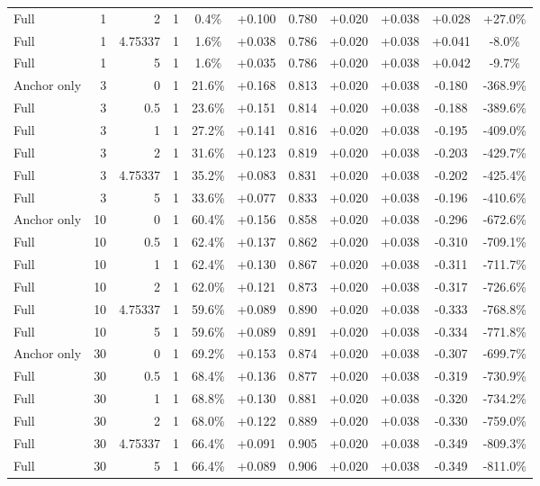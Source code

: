 \begin{table}[htbp]
\begin{tabular}{lrrrccccccc}
Full & 1 & 2 & 1 & 0.4\% & +0.100 & 0.780 & +0.020 & +0.038 & +0.028 & +27.0\% \\
Full & 1 & 4.75337 & 1 & 1.6\% & +0.038 & 0.786 & +0.020 & +0.038 & +0.041 & -8.0\% \\
Full & 1 & 5 & 1 & 1.6\% & +0.035 & 0.786 & +0.020 & +0.038 & +0.042 & -9.7\% \\
Anchor only & 3 & 0 & 1 & 21.6\% & +0.168 & 0.813 & +0.020 & +0.038 & -0.180 & -368.9\% \\
Full & 3 & 0.5 & 1 & 23.6\% & +0.151 & 0.814 & +0.020 & +0.038 & -0.188 & -389.6\% \\
Full & 3 & 1 & 1 & 27.2\% & +0.141 & 0.816 & +0.020 & +0.038 & -0.195 & -409.0\% \\
Full & 3 & 2 & 1 & 31.6\% & +0.123 & 0.819 & +0.020 & +0.038 & -0.203 & -429.7\% \\
Full & 3 & 4.75337 & 1 & 35.2\% & +0.083 & 0.831 & +0.020 & +0.038 & -0.202 & -425.4\% \\
Full & 3 & 5 & 1 & 33.6\% & +0.077 & 0.833 & +0.020 & +0.038 & -0.196 & -410.6\% \\
Anchor only & 10 & 0 & 1 & 60.4\% & +0.156 & 0.858 & +0.020 & +0.038 & -0.296 & -672.6\% \\
Full & 10 & 0.5 & 1 & 62.4\% & +0.137 & 0.862 & +0.020 & +0.038 & -0.310 & -709.1\% \\
Full & 10 & 1 & 1 & 62.4\% & +0.130 & 0.867 & +0.020 & +0.038 & -0.311 & -711.7\% \\
Full & 10 & 2 & 1 & 62.0\% & +0.121 & 0.873 & +0.020 & +0.038 & -0.317 & -726.6\% \\
Full & 10 & 4.75337 & 1 & 59.6\% & +0.089 & 0.890 & +0.020 & +0.038 & -0.333 & -768.8\% \\
Full & 10 & 5 & 1 & 59.6\% & +0.089 & 0.891 & +0.020 & +0.038 & -0.334 & -771.8\% \\
Anchor only & 30 & 0 & 1 & 69.2\% & +0.153 & 0.874 & +0.020 & +0.038 & -0.307 & -699.7\% \\
Full & 30 & 0.5 & 1 & 68.4\% & +0.136 & 0.877 & +0.020 & +0.038 & -0.319 & -730.9\% \\
Full & 30 & 1 & 1 & 68.8\% & +0.130 & 0.881 & +0.020 & +0.038 & -0.320 & -734.2\% \\
Full & 30 & 2 & 1 & 68.0\% & +0.122 & 0.889 & +0.020 & +0.038 & -0.330 & -759.0\% \\
Full & 30 & 4.75337 & 1 & 66.4\% & +0.091 & 0.905 & +0.020 & +0.038 & -0.349 & -809.3\% \\
Full & 30 & 5 & 1 & 66.4\% & +0.089 & 0.906 & +0.020 & +0.038 & -0.349 & -811.0\% \\

\end{tabular}
\end{table}
